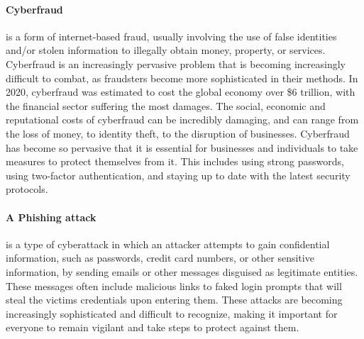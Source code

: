 \documentclass[12pt]{scrbook}
\begin{document}
\paragraph{Cyberfraud} is a form of internet-based fraud, usually involving the use of false identities
and/or stolen information to illegally obtain money, property, or services.
Cyberfraud is an increasingly pervasive problem that is becoming increasingly
difficult to combat, as fraudsters become more sophisticated in their methods.
In 2020, cyberfraud was estimated to cost the global economy over \$6
trillion\cite{6trillion}, with the financial sector suffering the most damages.
The social, economic and reputational costs of cyberfraud can be incredibly
damaging, and can range from the loss of money, to identity theft, to the
disruption of businesses. Cyberfraud has become so pervasive that it is
essential for businesses and individuals to take measures to protect themselves
from it. This includes using strong passwords, using two-factor authentication,
and staying up to date with the latest security protocols.

\paragraph{A Phishing attack} is a type of cyberattack in which an attacker attempts to gain
confidential information, such as passwords, credit card numbers, or other
sensitive information, by sending emails or other messages disguised as
legitimate entities. These messages often include malicious links to faked login
prompts that will steal the victims credentials upon entering them. These
attacks are becoming increasingly sophisticated and difficult to recognize,
making it important for everyone to remain vigilant and take steps to protect
against them.
\end{document}
